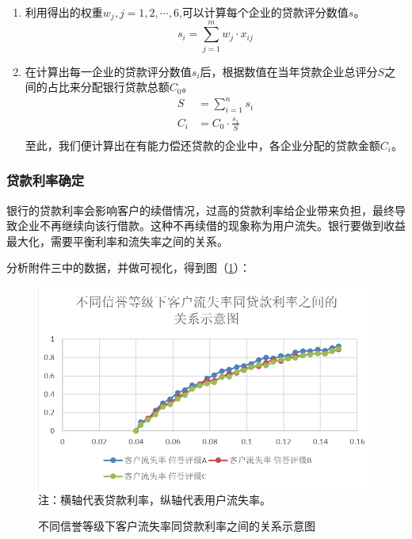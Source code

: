 \documentclass{my_paper}
\begin{document}
\begin{enumerate}
    \item 利用得出的权重$w_j,j=1,2,\cdots,6$,可以计算每个企业的贷款评分数值$s$。
    \begin{equation}
    s_i = \sum\limits^m_{j=1}w_j\cdot x_{ij}
    \label{si}
    \end{equation}

    \item 在计算出每一企业的贷款评分数值$s_i$后，根据数值在当年贷款企业总评分$S$之间的占比来分配银行贷款总额$C_0$。
    \begin{equation}
    \begin{aligned}
        S &= \sum\limits^n_{i=1} s_i\\
        C_i &= C_0 \cdot \frac{s_1}{S}\\
    \end{aligned}
    \label{sci}
    \end{equation}
    至此，我们便计算出在有能力偿还贷款的企业中，各企业分配的贷款金额$C_i$。
\end{enumerate}

\subsubsection{贷款利率确定}
银行的贷款利率会影响客户的续借情况，过高的贷款利率给企业带来负担，最终导致企业不再继续向该行借款。这种不再续借的现象称为用户流失。银行要做到收益最大化，需要平衡利率和流失率之间的关系。

分析附件三中的数据，并做可视化，得到图（\ref{513}）：
\begin {figure}[h]
\centering %
\includegraphics[width=\textwidth]{513.png}
注：横轴代表贷款利率，纵轴代表用户流失率。
\caption{不同信誉等级下客户流失率同贷款利率之间的关系示意图} 
\label{513}
\end {figure}
\end{document}
